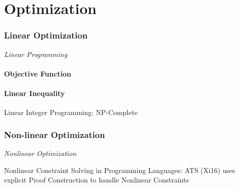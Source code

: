 \part{Optimization}\label{part:optimization}

\section{Linear Optimization}\label{sec:linear_optimization}

\emph{Linear Programming}



\subsection{Objective Function}\label{sec:objective_function}

\subsection{Linear Inequality}\label{sec:linear_inequality}

Linear Integer Programming: NP-Complete



\section{Non-linear Optimization}\label{sec:nonlinear_optimization}

\emph{Nonlinear Optimization}

Nonlinear Constraint Solving in Programming Languages: ATS (Xi16) uses
explicit Proof Construction to handle Nonlinear Constraints



